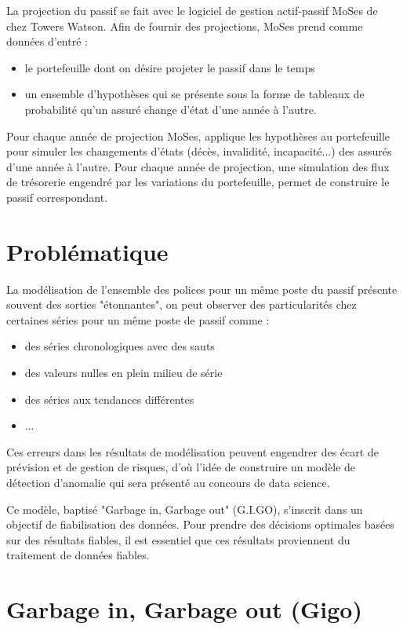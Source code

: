 La projection du passif se fait avec le logiciel de gestion actif-passif MoSes de chez Towers Watson. Afin de fournir des projections, MoSes prend comme données d'entré :

\begin{itemize}
\item le portefeuille dont on désire projeter le passif dans le temps
\item un ensemble d'hypothèses qui se présente sous la forme de tableaux de probabilité qu'un assuré change d'état d'une année à l'autre.
\end{itemize}

Pour chaque année de projection MoSes, applique les hypothèses au portefeuille pour simuler les changements d'états (décès, invalidité, incapacité...) des assurés d'une année à l'autre. Pour chaque année de projection, une simulation des flux de trésorerie engendré par les variations du  portefeuille, permet de construire le passif correspondant. 

\section{Problématique}

La modélisation de l'ensemble des polices pour un même poste du passif présente souvent des sorties "étonnantes", on peut observer des particularités chez certaines séries pour un même poste de passif comme : 

\begin{itemize}
\item des séries chronologiques avec des sauts
\item des valeurs nulles en plein milieu de série
\item des séries aux tendances différentes 
\item ...
\end{itemize}

Ces erreurs dans les résultats de modélisation peuvent engendrer des écart de prévision et de gestion de risques, d'où l'idée de construire un modèle de détection d'anomalie qui sera présenté au concours de data science.

Ce modèle, baptisé "Garbage in, Garbage out" (G.I.GO), s'inscrit dans un objectif de fiabilisation des données. Pour prendre des décisions optimales basées sur des résultats fiables, il est essentiel que ces résultats proviennent du traitement de données fiables.

\section{Garbage in, Garbage out (Gigo)}

